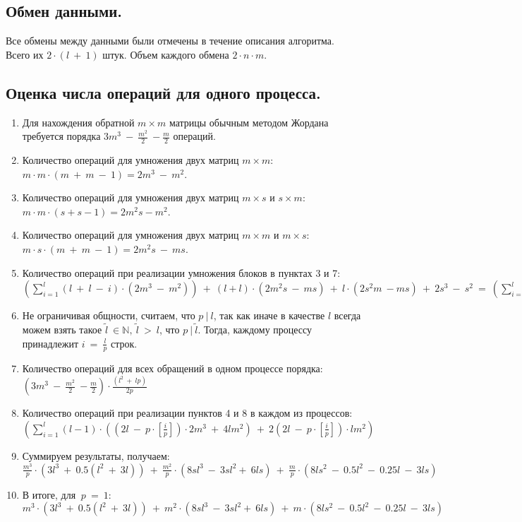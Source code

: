 \documentclass[14pt,a4paper, openany]{article}
\begin{document}
	\subsection{Обмен данными.}
	Все обмены между данными были отмечены в течение описания алгоритма. Всего их $2\cdot(l\ +\ 1)$ штук. Объем каждого обмена $2\cdot n\cdot m$.	\subsection{Оценка числа операций для одного процесса.}
	\begin{enumerate}
		\item Для нахождения обратной $m\times m$ матрицы обычным методом Жордана требуется порядка $ 3m^3\ -\ \frac{m^2}{2}\ -\frac{m}{2}$ операций.
		\item Количество операций для умножения двух матриц $m\times m$:  $m\cdot m\cdot(m\ +\ m\ -\ 1) = 2m^3\ -\ m^2$.
		\item Количество операций для умножения двух матриц $m\times s$ и $s\times m$:  $m\cdot m\cdot(s+s-1) = 2m^2s - m^2$.
		\item Количество операций для умножения двух матриц $m\times m$ и $m\times s$: $m\cdot s\cdot(m\ +\ m\ -\ 1) = 2m^2s\ -\ ms$.
		\item Количество операций при реализации умножения блоков в пунктах 3 и 7: $(\sum\limits_{i=1}^{l}(l\ +\ l\ -\ i)\cdot (2m^3\ -\ m^2))\ +\ (l + l)\cdot (2m^2s\ -\ ms)\ +\ l\cdot (2s^2m\ - ms)\ +\ 2s^3\ -\ s^2\ =\ (\sum\limits_{i=1}^{l}(2l\ -\ i)\cdot (2m^3\ -\ m^2))\ +\ 2l\cdot (2m^2s\ -\ ms)\ +\ l\cdot (2s^2m\ - ms)\ +\ 2s^3\ -\ s^2\ $
		\item Не ограничивая общности, считаем, что $p\ |\ l$, так как иначе в качестве $l$ всегда можем взять такое $\tilde l\ \in \mathbb{N},\ \tilde l\ >\ l$, что $p\ |\ \tilde l$.
		Тогда, каждому процессу принадлежит $i\ =\ \frac{l}{p}$ строк.
		\item Количество операций для всех обращений в одном процессе порядка: $(3m^3\ -\ \frac{m^2}{2}\ -\frac{m}{2})\cdot \frac {(l^2\ +\ lp)}{2p}$
		\item Количество операций при реализации пунктов 4 и 8 в каждом из процессов: $(\sum\limits_{i=1}^{l}(l - 1)\cdot ((2l\ -\ p\cdot [\frac{i}{p}])\cdot 2m^3\ +\ 4lm^2)\ +\ 2(2l\ -\ p\cdot [\frac{i}{p}])\cdot lm^2)$
		\item Суммируем результаты, получаем: $\frac{m^3}{p}\cdot (3l^3\ +\ 0.5(l^2\ +\ 3l))\ +\ \frac{m^2}{p}\cdot (8sl^3\ -\ 3sl^2 +\ 6ls)\ +\ \frac{m}{p}\cdot (8ls^2\ -\ 0.5l^2\ -\ 0.25l\ -\ 3ls)$ 
		\item В итоге, для $\ p\ =\ 1$: $m^3\cdot (3l^3\ +\ 0.5(l^2\ +\ 3l))\ +\ m^2\cdot (8sl^3\ -\ 3sl^2 +\ 6ls)\ +\ m \cdot (8ls^2\ -\ 0.5l^2\ -\ 0.25l\ -\ 3ls)$  
	\end{enumerate}
\end{document}
